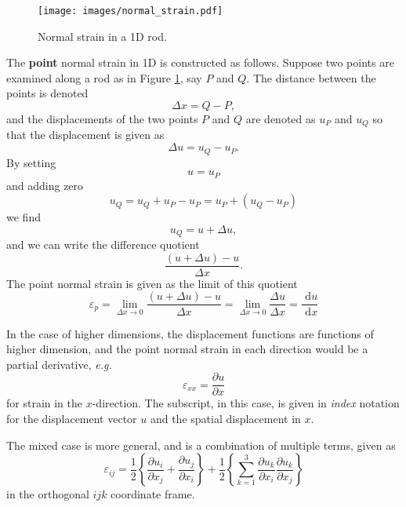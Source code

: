 \begin{figure}[ht!]
\caption{Normal strain in a 1D rod.}
\centering
\texttt{[image: images/normal\_strain.pdf]}
\label{im:norm.strain}
\end{figure}

The \textbf{point} normal strain in 1D is constructed as follows. Suppose two points are examined along a rod as in Figure \ref{im:norm.strain}, say $P$ and $Q$. The distance between the points is denoted 
\begin{equation}
\Delta x = Q-P,
\end{equation} 
and the displacements of the two points $P$ and $Q$ are denoted as $u_P$ and $u_Q$ so that the displacement is given as 
\begin{equation}
\Delta u = u_Q-u_P.
\end{equation}
By setting 
\begin{equation}
u = u_P
\end{equation}
and adding zero
\begin{equation}
u_Q = u_Q + u_P - u_P = u_P+(u_Q-u_P)
\end{equation}
we find
\begin{equation}
u_Q = u + \Delta u,
\end{equation}
and we can write the difference quotient
\begin{equation}
\frac{(u+\Delta u)-u}{\Delta x}.
\end{equation}
The point normal strain is given as the limit of this quotient
\begin{equation}
\varepsilon_p = \lim_{\Delta x\to 0} \frac{(u+\Delta u)-u}{\Delta x} = \lim_{\Delta x\to 0} \frac{\Delta u}{\Delta x} = \frac{\text{ d}u}{\text{ d}x}
\end{equation}

In the case of higher dimensions, the displacement functions are functions of higher dimension, and the point normal strain in each direction would be a partial derivative, \emph{e.g.}
\begin{equation}
\varepsilon_{xx} = \frac{\partial u}{\partial x}
\label{eq:strain.oned}
\end{equation}
for strain in the $x$-direction. The subscript, in this case, is given in \emph{index} notation for the displacement vector $u$ and the spatial displacement in $x$. 

The mixed case is more general, and is a combination of multiple terms, given as
\begin{equation}
\label{eq:strain.linear}
\varepsilon_{ij} = \frac{1}{2}\left\lbrace \frac{\partial u_i}{\partial x_j}+\frac{\partial u_j}{\partial x_i}\right\rbrace +\frac{1}{2}\left\lbrace \sum_{k=1}^3{\frac{\partial u_k}{\partial x_i}\frac{\partial u_k}{\partial x_j}}\right\rbrace
\end{equation}
in the orthogonal $ijk$ coordinate frame.


